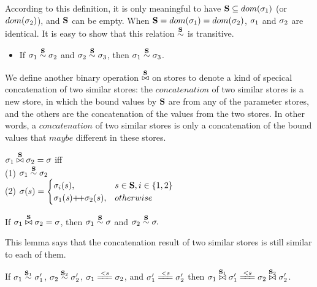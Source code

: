 According to this definition, it is only meaningful to have $\S  \subseteq dom(\sgm_1)$ (or $dom(\sgm_2)$), and $\S$ can be empty. 
When $\S = dom(\sgm_1) = dom(\sgm_2)$, $\sgm_1$ and $\sgm_2$ are identical. 
It is easy to show that this relation $\overset{\S}{\sim}$ is transitive.
\begin{itemize}
	\item If $\sgm_1 \~\S \sgm_2$ and $\sgm_2 \~\S \sgm_3$, then $\sgm_1 \~\S \sgm_3$.
	
\end{itemize}


We define another binary operation $\x\S$ on stores to denote a kind of specical concatenation of two similar stores: 
the $concatenation$ of two similar stores is a new store, in which the bound values by $\S$ are from any of the parameter stores, and 
the others are the concatenation of the values from the two stores. 
In other words, a $concatenation$ of two similar stores is only a concatenation of the bound values that $maybe$ different in these stores.
\begin{defi}
	\label{def-sgm-join}
	$\sgm_1 \x{\S} \sgm_2 = \sgm$ iff \\
	(1) $\sgm_1 \~{\S} \sgm_2$  \\
	(2) $\sgm(s) =
	\begin{cases}
	\sgm_i(s),& s \in \S, i \in \{1,2\}\\
	\sgm_1(\s) {\++} \sgm_2(s), & otherwise \\
	\end{cases} $
\end{defi}

\begin{lem} \label{lem-join1}
	If $\sgm_1 \x{\S} \sgm_2 = \sgm$, 
	then $\sgm_1 \~{\S} \sgm$ and $\sgm_2 \~{\S} \sgm.$
\end{lem}
This lemma says that the concatenation result of two similar stores is still similar to each of them.


\begin{lem}\label{lem-join2}
	If $\sgm_1 \~{\S_1} \sgm'_1$, $\sgm_2 \~{\S_2} \sgm'_2$, $\sgm_1 \ConEq{s} \sgm_2$,
	and $\sgm'_1 \ConEq{\s} \sgm_2'$  
	then $\sgm_1 \x{\S_1} \sgm_1' \ConEq{s} \sgm_2 \x{\S_2} \sgm'_2$. 
\end{lem}

